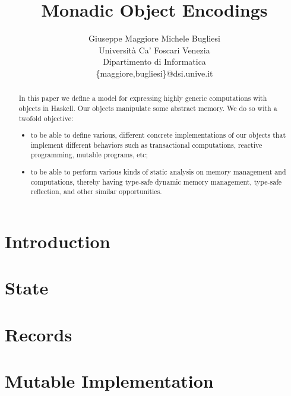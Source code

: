 \documentclass[a4paper]{article}
\begin{document}
\title{\bf Monadic Object Encodings}

\author{Giuseppe Maggiore \quad Michele Bugliesi
 \\ Universit\`a Ca' Foscari Venezia
 \\ Dipartimento di Informatica 
 \\ \{maggiore,bugliesi\}@dsi.unive.it
}

\date{}
\maketitle

\begin{abstract}
In this paper we define a model for expressing highly generic
computations with objects in Haskell. Our objects manipulate
some abstract memory. We do so with a twofold objective:
\begin{itemize}
\item to be able to define various, different concrete 
implementations of our objects that implement different
behaviors such as transactional computations, reactive
programming, mutable programs, etc;
\item to be able to perform various kinds of static analysis 
on memory management and computations, thereby having 
type-safe dynamic memory management, type-safe reflection, 
and other similar opportunities.
\end{itemize}
\end{abstract}

\section{Introduction}
\label{sec:intro}
 

\section{State}
\label{sec:state}
 

\section{Records}
\label{sec:records}
 

\section{Mutable Implementation}
\label{sec:mutable_implementation}
 
\end{document}
